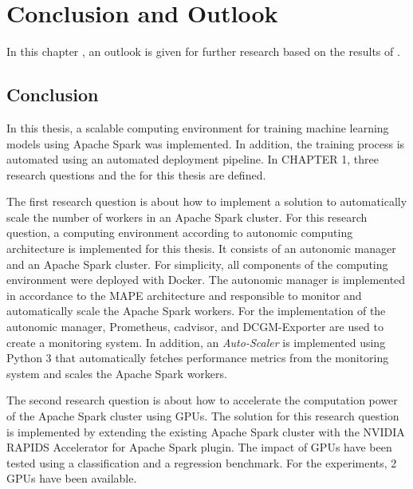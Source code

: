 \chapter{Conclusion and Outlook}
\label{chap:08_outlook}

In this chapter , an outlook is given for further research based on the results of .


\section{Conclusion}
In this thesis, a scalable computing environment for training machine learning models using Apache Spark was implemented. In addition, the training process is automated using an automated deployment pipeline.
In CHAPTER 1, three research questions and the  for this thesis are defined.


The first research question is about how to implement a solution to automatically scale the number of workers in an Apache Spark cluster.
For this research question, a computing environment according to autonomic computing architecture  is implemented for this thesis.
It consists of an autonomic manager and an Apache Spark cluster.
For simplicity, all components of the computing environment were deployed with Docker.
The autonomic manager is implemented in accordance to the MAPE architecture and responsible to monitor and automatically scale the Apache Spark workers.
For the implementation of the autonomic manager, Prometheus, cadvisor, and DCGM-Exporter are used to create a monitoring system.
In addition, an \textit{Auto-Scaler} is implemented using Python 3 that automatically fetches performance metrics from the monitoring system and scales the Apache Spark workers.


The second research question is about how to accelerate the computation power of the Apache Spark cluster using GPUs.
The solution for this research question is implemented by extending the existing Apache Spark cluster with the NVIDIA RAPIDS Accelerator for Apache Spark plugin.
%
The impact of GPUs have been tested using a classification and a regression benchmark. For the experiments, 2 GPUs have been available. 


